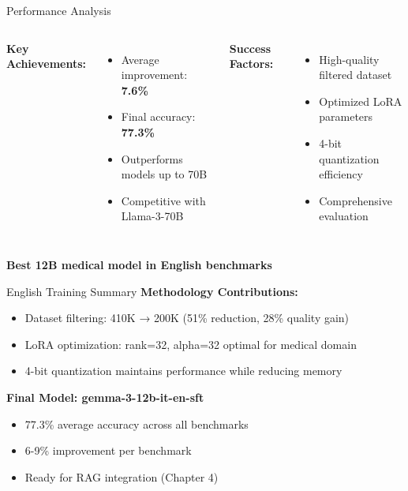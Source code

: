 \begin{frame}{Performance Analysis}
    \begin{columns}[T]
        \textbf{Key Achievements:}
        \begin{itemize}
            \item Average improvement: \textbf{7.6\%}
            \item Final accuracy: \textbf{77.3\%}
            \item Outperforms models up to 70B
            \item Competitive with Llama-3-70B
        \end{itemize}
        
        \textbf{Success Factors:}
        \begin{itemize}
            \item High-quality filtered dataset
            \item Optimized LoRA parameters
            \item 4-bit quantization efficiency
            \item Comprehensive evaluation
        \end{itemize}
    \end{columns}
    
    \vspace{1em}
    
    \begin{center}
        \colorbox{highlight!20}{\textbf{Best 12B medical model in English benchmarks}}
    \end{center}
\end{frame}

\begin{frame}{English Training Summary}
    \textbf{Methodology Contributions:}
    \begin{itemize}
        \item Dataset filtering: 410K → 200K (51\% reduction, 28\% quality gain)
        \item LoRA optimization: rank=32, alpha=32 optimal for medical domain
        \item 4-bit quantization maintains performance while reducing memory
    \end{itemize}
    
    \vspace{0.5em}
    
    \textbf{Final Model: gemma-3-12b-it-en-sft}
    \begin{itemize}
        \item 77.3\% average accuracy across all benchmarks
        \item 6-9\% improvement per benchmark
        \item Ready for RAG integration (Chapter 4)
    \end{itemize}
\end{frame}

